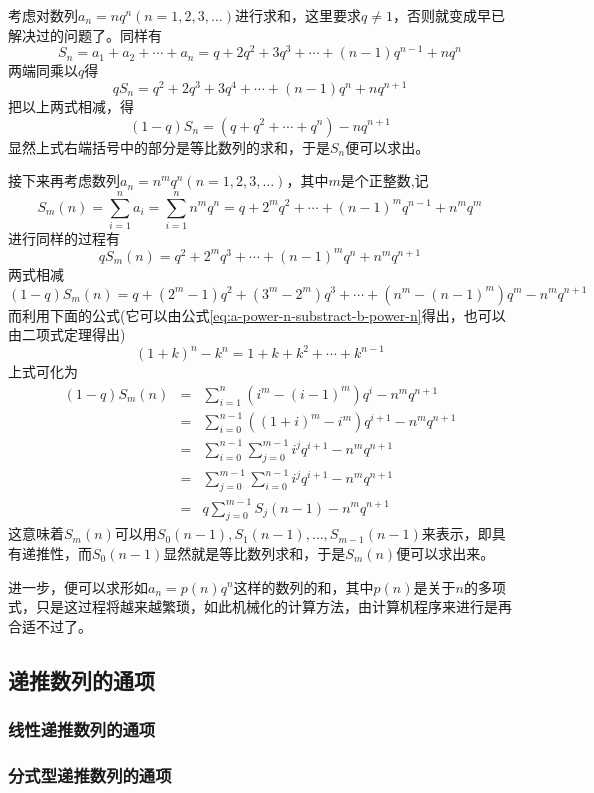\begin{example}[错位相减法的一个用途]
  考虑对数列$a_n = n q^n(n=1,2,3,\ldots)$进行求和，这里要求$q \neq 1$，否则就变成早已解决过的问题了。同样有
  \[ S_n = a_1+a_2+\cdots+a_n = q+2q^2+3q^3 + \cdots + (n-1)q^{n-1} + nq^n \]
  两端同乘以$q$得
  \[ qS_n = q^2+2q^3+3q^4 + \cdots + (n-1)q^n + nq^{n+1} \]
  把以上两式相减，得
  \[ (1-q)S_n = (q + q^2 + \cdots + q^n) - n q^{n+1} \]
  显然上式右端括号中的部分是等比数列的求和，于是$S_n$便可以求出。

  接下来再考虑数列$a_n=n^mq^n(n=1,2,3,\ldots)$，其中$m$是个正整数,记
  \[ S_m(n) = \sum_{i=1}^na_i = \sum_{i=1}^n n^m q^n = q + 2^mq^2 + \cdots + (n-1)^mq^{n-1} + n^m q^m \]
  进行同样的过程有
  \[ qS_m(n) = q^2 + 2^mq^3 + \cdots + (n-1)^m q^n + n^m q^{n+1} \]
  两式相减
  \[ (1-q)S_m(n) = q +(2^m-1)q^2 + (3^m-2^m)q^3 + \cdots + (n^m-(n-1)^m)q^m - n^mq^{n+1}  \]
  而利用下面的公式(它可以由公式\autoref{eq:a-power-n-substract-b-power-n}得出，也可以由二项式定理得出)
  \[ (1+k)^n-k^n = 1+k+k^2 + \cdots + k^{n-1} \]
  上式可化为
  \begin{eqnarray*}
    (1-q)S_m(n) & = & \sum_{i=1}^n(i^m-(i-1)^m)q^i - n^mq^{n+1} \\
                & = & \sum_{i=0}^{n-1}((1+i)^m-i^m)q^{i+1} - n^mq^{n+1} \\
                & = & \sum_{i=0}^{n-1}\sum_{j=0}^{m-1}i^jq^{i+1} - n^mq^{n+1} \\
                & = & \sum_{j=0}^{m-1}\sum_{i=0}^{n-1}i^jq^{i+1} - n^mq^{n+1} \\
    & = & q\sum_{j=0}^{m-1}S_j(n-1) - n^mq^{n+1}
  \end{eqnarray*}
  这意味着$S_m(n)$可以用$S_0(n-1),S_1(n-1),\ldots,S_{m-1}(n-1)$来表示，即具有递推性，而$S_0(n-1)$显然就是等比数列求和，于是$S_m(n)$便可以求出来。

  进一步，便可以求形如$a_n=p(n)q^n$这样的数列的和，其中$p(n)$是关于$n$的多项式，只是这过程将越来越繁琐，如此机械化的计算方法，由计算机程序来进行是再合适不过了。
\end{example}

\subsection{递推数列的通项}

\subsubsection{线性递推数列的通项}

\subsubsection{分式型递推数列的通项}

